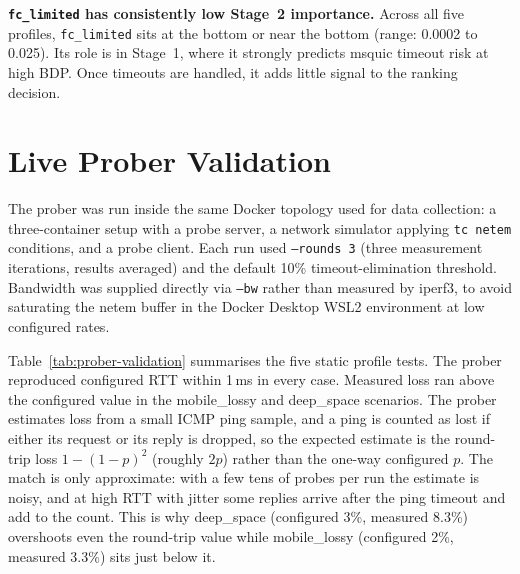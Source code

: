 \textbf{\texttt{fc\_limited} has consistently low Stage~2 importance.} Across
all five profiles, \texttt{fc\_limited} sits at the bottom or near the bottom
(range: 0.0002 to 0.025). Its role is in Stage~1, where it strongly predicts
msquic timeout risk at high BDP. Once timeouts are handled, it adds little
signal to the ranking decision.

\section{Live Prober Validation}
\label{sec:prober-validation}

The prober was run inside the same Docker topology used for data collection:
a three-container setup with a probe server, a network simulator applying
\texttt{tc netem} conditions, and a probe client. Each run used
\texttt{--rounds~3} (three measurement iterations, results averaged) and the
default 10\% timeout-elimination threshold. Bandwidth was supplied directly
via \texttt{--bw} rather than measured by iperf3, to avoid saturating the
netem buffer in the Docker Desktop WSL2 environment at low configured rates.

Table~\ref{tab:prober-validation} summarises the five static profile tests.
The prober reproduced configured RTT within 1\,ms in every case. Measured loss
ran above the configured value in the mobile\_lossy and deep\_space scenarios.
The prober estimates loss from a small ICMP ping sample, and a ping is counted
as lost if either its request or its reply is dropped, so the expected estimate
is the round-trip loss $1-(1-p)^2$ (roughly $2p$) rather than the one-way
configured $p$. The match is only approximate: with a few tens of probes per
run the estimate is noisy, and at high RTT with jitter some replies arrive after
the ping timeout and add to the count. This is why deep\_space (configured 3\%,
measured 8.3\%) overshoots even the round-trip value while mobile\_lossy
(configured 2\%, measured 3.3\%) sits just below it.

